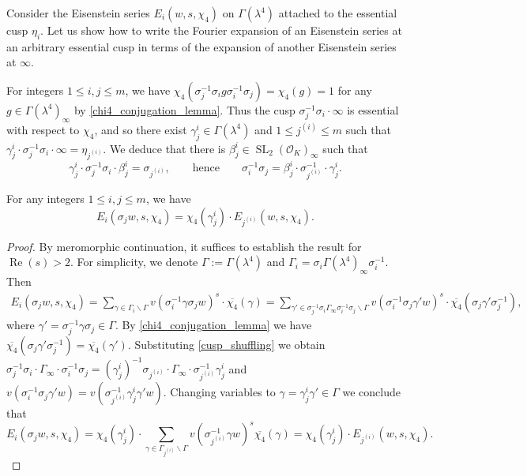 \documentclass[12pt,reqno]{amsart}
\numberwithin{equation}{section}
\renewcommand{\Re}{\operatorname{Re}}
\DeclareMathOperator{\SL}{SL}
\begin{document}
Consider the Eisenstein series $E_{i}(w,s,\chi_4)$ on $\Gamma(\lambda^4)$ attached to the essential cusp $\eta_i$. Let us show how to write the Fourier expansion of an Eisenstein series at an arbitrary essential cusp in terms of the expansion of another Eisenstein series at $\infty$.

For integers $1\leq i, j\leq m$, we have $\chi_4(\sigma_{j}^{-1}\sigma_i g \sigma_{i}^{-1}\sigma_j) = \chi_4(g) = 1$ for any $g \in \Gamma(\lambda^4)_{\infty}$ by \cref{chi4_conjugation_lemma}. Thus the cusp $\sigma_{j}^{-1}\sigma_i \cdot\infty$ is essential with respect to $\chi_4$, and so there exist $\gamma_{j}^i \in \Gamma(\lambda^4)$ and $1\leq j^{(i)} \leq m$ such that $\gamma_{j}^i \cdot\sigma_{j}^{-1}\sigma_i \cdot \infty = \eta_{j^{(i)}}$.  We deduce that there is $\beta_j^i \in \SL_2(\mathcal{O}_K)_\infty$ such that 
\begin{equation}\label{cusp_shuffling}
    \gamma_{j}^i \cdot\sigma_{j}^{-1} \sigma_i \cdot \beta_{j}^i  =  \sigma_{j^{(i)}}, \qquad \text{hence} \qquad  \sigma_{i}^{-1} \sigma_j   =   \beta_{j}^i \cdot \sigma_{j^{(i)}}^{-1} \cdot \gamma_{j}^i.
\end{equation}

\begin{lemma}\label{Eis_change_cusp_lemma}
    For any integers $1\leq i, j\leq m$, we have
    \begin{equation*}
        E_i(\sigma_jw, s, \chi_4) = \chi_4(\gamma_j^i) \cdot E_{j^{(i)}}(w, s, \chi_4).
    \end{equation*}
\end{lemma}

\begin{proof}
By meromorphic continuation, it suffices to establish the result for $\Re(s) > 2$. For simplicity, we denote $\Gamma := \Gamma(\lambda^4)$ and $\Gamma_i = \sigma_i \Gamma(\lambda^4)_\infty \sigma_i^{-1}$. Then
\begin{align*}
    E_i(\sigma_jw, s, \chi_4) = \sum_{\gamma \in \Gamma_i \backslash\Gamma} v(\sigma_i^{-1} \gamma \sigma_j w)^s \cdot \overline{\chi_4}(\gamma) = \sum_{\gamma' \in \sigma_j^{-1}\sigma_i \Gamma_\infty \sigma_i^{-1}\sigma_j\backslash\Gamma} v(\sigma_i^{-1} \sigma_j \gamma' w)^s \cdot \overline{\chi_4}(\sigma_j\gamma'\sigma_j^{-1}),
\end{align*}
where $\gamma' = \sigma_j^{-1}\gamma\sigma_j \in \Gamma$. By \cref{chi4_conjugation_lemma} we have $\overline{\chi_4}(\sigma_j\gamma'\sigma_j^{-1}) = \overline{\chi_4}(\gamma')$. Substituting \eqref{cusp_shuffling} we obtain $\sigma_j^{-1}\sigma_i \cdot \Gamma_\infty \cdot \sigma_i^{-1}\sigma_j = (\gamma_j^i)^{-1}\sigma_{j^{(i)}}\cdot \Gamma_\infty\cdot \sigma_{j^{(i)}}^{-1}\gamma_j^i$ and $v(\sigma_i^{-1} \sigma_j \gamma' w) = v(\sigma_{j^{(i)}}^{-1} \gamma_j^i \gamma' w)$. Changing variables to $\gamma = \gamma_j^i \gamma' \in \Gamma$ we conclude that
\begin{equation*}
    E_i(\sigma_jw, s, \chi_4) = \chi_4(\gamma_j^i) \cdot \sum_{\gamma \in \Gamma_{j^{(i)}} \backslash\Gamma} v(\sigma_{j^{(i)}}^{-1} \gamma w)^s \overline{\chi_4}(\gamma) = \chi_4(\gamma_j^i) \cdot E_{j^{(i)}}(w, s, \chi_4).
\end{equation*}
\end{proof}
\end{document}
